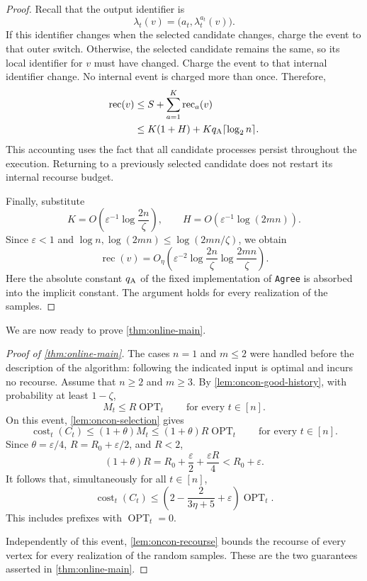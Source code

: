 \documentclass[11pt]{article}
\theoremstyle{definition}
\theoremstyle{remark}
\newcommand{\OPT}{\operatorname{OPT}}
\newcommand{\cost}{\operatorname{cost}}
\newcommand{\1}{\mathbf{1}}
\begin{document}
\begin{proof}
Recall that the output identifier is
\[
    \lambda_t(v)
    =
    \bigl(a_t,\lambda_t^{a_t}(v)\bigr).
\]
If this identifier changes when the selected candidate changes,
charge the event to that outer switch. Otherwise, the selected
candidate remains the same, so its local identifier for $v$ must
have changed. Charge the event to that internal identifier change.
No internal event is charged more than once. Therefore,
\begin{align*}
    \operatorname{rec}(v)
    &\leq
    S+\sum_{a=1}^{K}\operatorname{rec}_a(v)\\
    &\leq
    K(1+H)+Kq_{\rm A}\lceil\log_2 n\rceil.
\end{align*}
This accounting uses the fact that all candidate processes persist
throughout the execution. Returning to a previously selected
candidate does not restart its internal recourse budget.

Finally, substitute
\[
    K=O\!\left(
        \varepsilon^{-1}\log\frac{2n}{\zeta}
    \right),
    \qquad
    H=O\!\left(
        \varepsilon^{-1}\log(2mn)
    \right).
\]
Since $\varepsilon<1$ and
$\log n,\log(2mn)\leq\log(2mn/\zeta)$, we obtain
\[
    \operatorname{rec}(v)
    =
    O_{\eta}\!\left(
        \varepsilon^{-2}
        \log\frac{2n}{\zeta}
        \log\frac{2mn}{\zeta}
    \right).
\]
Here the absolute constant $q_{\rm A}$ of the fixed implementation
of \texttt{Agree} is absorbed into the implicit constant.
The argument holds for every realization of the samples.
\end{proof}

We are now ready to prove \cref{thm:online-main}.

\begin{proof}[Proof of \cref{thm:online-main}]
The cases $n=1$ and $m\leq 2$ were handled before the description
of the algorithm: following the indicated input is optimal and
incurs no recourse. Assume that $n\geq 2$ and $m\geq 3$.
By \cref{lem:oncon-good-history}, with probability at least
$1-\zeta$,
\[
    M_t\leq R\OPT_t
    \qquad\text{for every }t\in[n].
\]
On this event, \cref{lem:oncon-selection} gives
\[
    \cost_t(C_t)
    \leq
    (1+\theta)M_t
    \leq
    (1+\theta)R\OPT_t
    \qquad\text{for every }t\in[n].
\]
Since $\theta=\varepsilon/4$, $R=R_0+\varepsilon/2$, and $R<2$,
\[
    (1+\theta)R
    =
    R_0+\frac{\varepsilon}{2}
    +\frac{\varepsilon R}{4}
    <
    R_0+\varepsilon.
\]
It follows that, simultaneously for all $t\in[n]$,
\[
    \cost_t(C_t)
    \leq
    \left(
        2-\frac{2}{3\eta+5}+\varepsilon
    \right)\OPT_t.
\]
This includes prefixes with $\OPT_t=0$.

Independently of this event, \cref{lem:oncon-recourse} bounds the
recourse of every vertex for every realization of the random samples.
These are the two guarantees asserted in \cref{thm:online-main}.
\end{proof}
\end{document}
